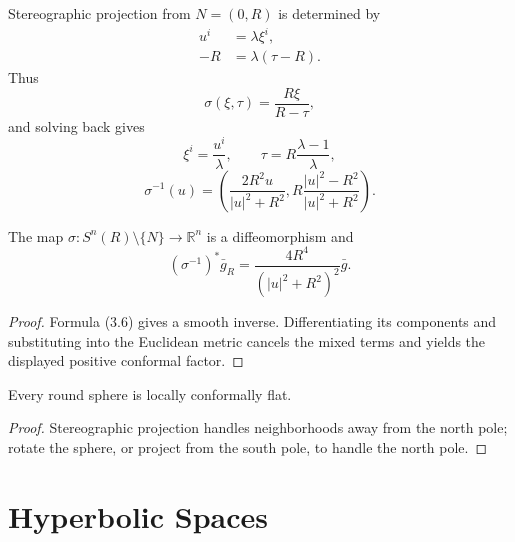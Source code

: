 Stereographic projection from $N=(0,R)$ is determined by
\begin{align*}
u^i&=\lambda\xi^i,\\
-R&=\lambda(\tau-R).
\tag{3.3}
\end{align*}
Thus
\begin{equation}
\sigma(\xi,\tau)=\frac{R\xi}{R-\tau},\tag{3.4}
\end{equation}
and solving back gives
\begin{equation}
\xi^i=\frac{u^i}{\lambda},\qquad \tau=R\frac{\lambda-1}{\lambda},\tag{3.5}
\end{equation}
\begin{equation}
\sigma^{-1}(u)=\left(\frac{2R^2u}{|u|^2+R^2},R\frac{|u|^2-R^2}{|u|^2+R^2}\right).\tag{3.6}
\end{equation}

\begin{proposition}
\label{prop:stereographic-conformal-diffeomorphism}
The map $\sigma:S^n(R)\setminus\{N\}\to\mathbb R^n$ is a diffeomorphism and
\[
(\sigma^{-1})^*\bar g_R=\frac{4R^4}{(|u|^2+R^2)^2}\bar g.
\]
\end{proposition}
\begin{proof}
\sketch Formula (3.6) gives a smooth inverse. Differentiating its components and substituting into the Euclidean metric cancels the mixed terms and yields the displayed positive conformal factor.
\end{proof}

\begin{corollary}
\label{cor:sphere-round-metric-locally-conformally-flat}
Every round sphere is locally conformally flat.
\end{corollary}
\begin{proof}
\sketch Stereographic projection handles neighborhoods away from the north pole; rotate the sphere, or project from the south pole, to handle the north pole.
\end{proof}

\section{Hyperbolic Spaces}


